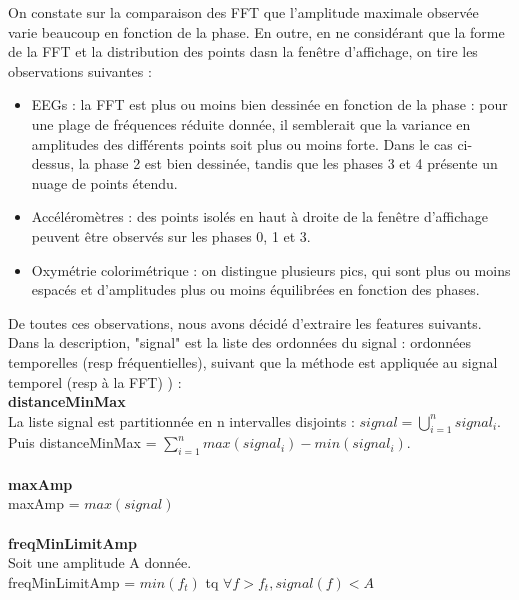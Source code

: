 \documentclass{article}
\begin{document}
On constate sur la comparaison des FFT que l'amplitude maximale observée varie beaucoup en fonction de la phase. En outre, en ne considérant que la forme de la FFT et la distribution des points dasn la fenêtre d'affichage, on tire les observations suivantes :
\\

\begin{itemize}
\item EEGs : la FFT est plus ou moins bien dessinée en fonction de la phase : pour une plage de fréquences réduite donnée, il semblerait que la variance en amplitudes des différents points soit plus ou moins forte. Dans le cas ci-dessus, la phase 2 est bien dessinée, tandis que les phases 3 et 4 présente un nuage de points étendu.
\item Accéléromètres : des points isolés en haut à droite de la fenêtre d'affichage peuvent être observés sur les phases 0, 1 et 3.
\item Oxymétrie colorimétrique : on distingue plusieurs pics, qui sont plus ou moins espacés et d'amplitudes plus ou moins équilibrées en fonction des phases.
\end{itemize}
\vspace{0.5cm}

De toutes ces observations, nous avons décidé d'extraire les features suivants. Dans la description, "signal" est la liste des ordonnées du signal : ordonnées temporelles (resp fréquentielles), suivant que la méthode est appliquée au signal temporel (resp à la FFT) ) :
\\

\textbf{distanceMinMax} \\
La liste signal est partitionnée en n intervalles disjoints : $signal = \bigcup\limits_{i=1}^n signal_i$. \\
Puis distanceMinMax = $\sum\limits_{i=1}^n max(signal_i) - min(signal_i)$.  \\\\

\textbf{maxAmp} \\
maxAmp = $max(signal)$ \\\\

\textbf{freqMinLimitAmp} \\
Soit une amplitude A donnée. \\
freqMinLimitAmp = $min(f_t)$ tq $\forall f > f_t, signal(f)< A$\\\\
\end{document}
